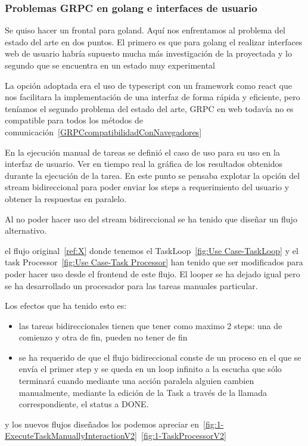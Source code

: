 
\subsubsection{Problemas GRPC en golang e interfaces de usuario}\label{subsec:problemas-rpc-en-golang}
Se quiso hacer un frontal para goland. Aquí nos enfrentamos al problema del estado del arte en dos puntos.
El primero es que para golang el realizar interfaces web de usuario habría supuesto mucha más investigación de la proyectada y lo segundo que se encuentra en un estado muy experimental

La opción adoptada era el uso de typescript con un framework como react que nos facilitara la implementación de una interfaz de forma rápida y eficiente, pero teníamos el segundo problema del estado del arte, GRPC en web todavía no es compatible para todos los métodos de comunicación~\cref{GRPCcompatibilidadConNavegadores}

En la ejecución manual de tareas se definió el caso de uso para su uso en la interfaz de usuario. Ver en tiempo real la gráfica de los resultados obtenidos durante la ejecución de la tarea. En este punto se pensaba explotar la opción del stream bidireccional para poder enviar los steps a requerimiento del usuario y obtener la respuestas en paralelo.

Al no poder hacer uso del stream bidireccional se ha tenido que diseñar un flujo alternativo.

el flujo original~\cref{ref:X} donde tenemos el TaskLoop~\cref{fig:Use Case-TaskLoop} y el task Processor~\cref{fig:Use Case-Task Processor} han tenido que ser modificados para poder hacer uso desde el frontend de este flujo. El looper se ha dejado igual pero se ha desarrollado un procesador para las tareas manuales particular.

Los efectos que ha tenido esto es:
\begin{itemize}
    \item las tareas bidireccionales tienen que tener como maximo 2 steps: una de comienzo y otra de fin, pueden no tener de fin
    \item se ha requerido de que el flujo bidireccional conste de un proceso en el que se envía el primer step y se queda en un loop infinito a la escucha que sólo terminará cuando mediante una acción paralela alguien cambien manualmente, mediante la edición de la Task a través de la llamada correspondiente, el status a DONE.
\end{itemize}

y los nuevos flujos diseñados los podemos apreciar en~\cref{fig:1-ExecuteTaskManuallyInteractionV2}~\cref{fig:1-TaskProcessorV2}


